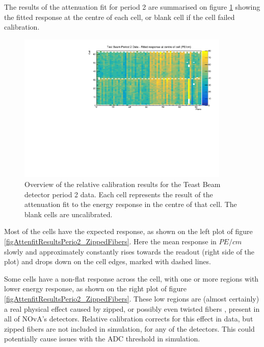 \documentclass[12pt,a4paper]{article}
\begin{document}
The results of the attenuation fit for period 2 are summarised on figure \ref{figCellCentreResponsePeriod2} showing the fitted response at the centre of each cell, or blank cell if the cell failed calibration.

\begin{figure}[h]
\centering
\includegraphics[width=0.9\textwidth]{Plots/CellResponseAtCentre_period2_Limited.pdf}
\caption{Overview of the relative calibration results for the Teast Beam detector period 2 data. Each cell represents the result of the attenuation fit to the energy response in the centre of that cell. The blank cells are uncalibrated.}
\label{figCellCentreResponsePeriod2}
\end{figure}

Most of the cells have the expected response, as shown on the left plot of figure \ref{figAttenfitResultsPerio2_ZippedFibers}. Here the mean response in $\unit{PE/cm}$ slowly and approximately constantly rises towards the readout (right side of the plot) and drops down on the cell edges, marked with dashed lines.

Some cells have a non-flat response across the cell, with one or more regions with lower energy response, as shown on the right plot of figure \ref{figAttenfitResultsPerio2_ZippedFibers}. These low regions are (almost certainly) a real physical effect caused by zipped, or possibly even twisted fibers \cite{NOVA-doc-43249}, present in all of NOvA's detectors. Relative calibration corrects for this effect in data, but zipped fibers are not included in simulation, for any of the detectors. This could potentially cause issues with the ADC threshold in simulation.
\end{document}
